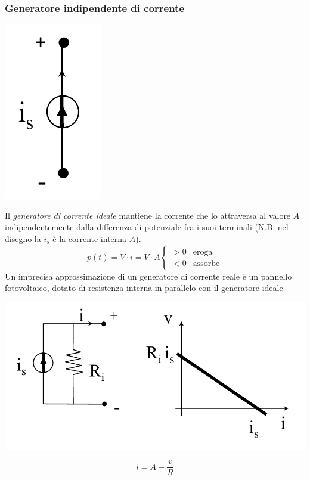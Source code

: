 \documentclass{article}
\begin{document}
\subsubsection{Generatore indipendente di corrente}
\begin{center}
    \includegraphics[scale=0.4]{Image/Gen corrente ideale.png}
\end{center}
Il \textit{generatore di corrente ideale} mantiene
la corrente che lo attraversa al valore $ A $ indipendentemente dalla
differenza di potenziale fra i suoi terminali (N.B. nel disegno la $i_s$ è la corrente interna $A$).
\[
    p(t) = V \cdot i = V \cdot A 
    \begin{cases}
        >0 &\text{eroga}\\
        <0 &\text{assorbe}
    \end{cases}
\]
Un imprecisa approssimazione di un generatore di corrente reale è un pannello fotovoltaico, dotato di resistenza interna in parallelo con il generatore ideale
\begin{center}
    \includegraphics[scale=0.4]{Image/Gen corrente reale.png}
\end{center}
\[
    i = A -\frac{v}{R}
\]
\end{document}
